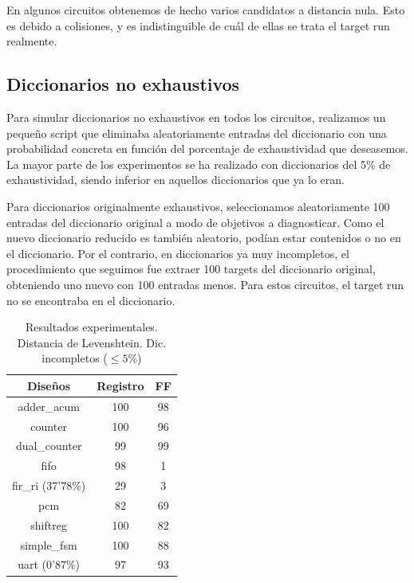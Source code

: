 En algunos circuitos obtenemos de hecho varios candidatos a distancia nula. Esto
es debido a colisiones, y es indistinguible de cuál de ellas se trata el target
run realmente.

\subsection{Diccionarios no exhaustivos}
\label{subsec:LevDicNoExhaust}
Para simular diccionarios no exhaustivos en todos los circuitos, realizamos un
pequeño script que eliminaba aleatoriamente entradas del diccionario con una
probabilidad concreta en función del porcentaje de exhaustividad que deseasemos.
La mayor parte de los experimentos se ha realizado con diccionarios del 5\% de
exhaustividad, siendo inferior en aquellos diccionarios que ya lo eran.

Para diccionarios originalmente exhaustivos, seleccionamos aleatoriamente 100
entradas del diccionario original a modo de objetivos a diagnosticar. Como el
nuevo diccionario reducido es también aleatorio, podían estar contenidos o no en
el diccionario. Por el contrario, en diccionarios ya muy incompletos, el
procedimiento que seguimos fue extraer 100 targets del diccionario original,
obteniendo uno nuevo con 100 entradas menos. Para estos circuitos, el target run
no se encontraba en el diccionario.

\begin{table}[htbp]
    \ttabbox
    {\caption{Resultados experimentales. Distancia de Levenshtein. Dic.
    incompletos ($\leq5\%$)}
    \label{tab:LevenRes}}
    {
        \begin{tabular}{c|c c}
            \hline
            \rule[-8pt]{0pt}{22pt}{\bfseries{Diseños}}&{\bfseries{Registro}}
            &{\bfseries{\gls{FF}}} \\
            \hline
            \rule{0pt}{14pt}adder\_acum & 100 & 98\\
            counter & 100 & 96\\
            dual\_counter & 99 & 99\\
            fifo & 98 & 1\\
            fir\_ri (37'78\%) & 29 & 3\\
            pcm & 82 & 69\\
            shiftreg & 100 & 82\\
            simple\_fsm & 100 & 88\\
            uart (0'87\%) & 97 & 93\\
            \hline
        \end{tabular}
    }
\end{table}

